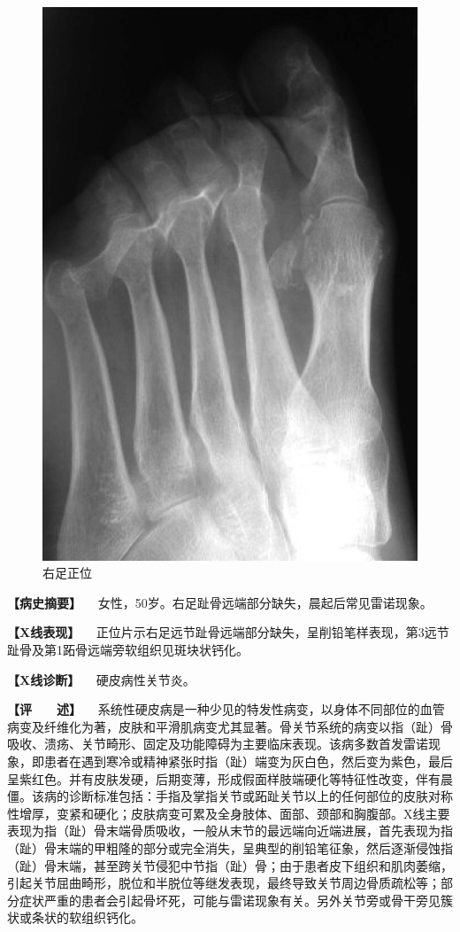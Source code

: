 \begin{figure}[!htbp]
 \centering
 \includegraphics{./images/Image00120.jpg}
 \captionsetup{justification=centering}
 \caption{右足正位}
 \label{fig2-8-6}
  \end{figure} 

\textbf{【病史摘要】}
　女性，50岁。右足趾骨远端部分缺失，晨起后常见雷诺现象。

\textbf{【X线表现】}
　正位片示右足远节趾骨远端部分缺失，呈削铅笔样表现，第3远节趾骨及第1跖骨远端旁软组织见斑块状钙化。

\textbf{【X线诊断】} 　硬皮病性关节炎。

\textbf{【评　　述】}
　系统性硬皮病是一种少见的特发性病变，以身体不同部位的血管病变及纤维化为著，皮肤和平滑肌病变尤其显著。骨关节系统的病变以指（趾）骨吸收、溃疡、关节畸形、固定及功能障碍为主要临床表现。该病多数首发雷诺现象，即患者在遇到寒冷或精神紧张时指（趾）端变为灰白色，然后变为紫色，最后呈紫红色。并有皮肤发硬，后期变薄，形成假面样肢端硬化等特征性改变，伴有晨僵。该病的诊断标准包括：手指及掌指关节或跖趾关节以上的任何部位的皮肤对称性增厚，变紧和硬化；皮肤病变可累及全身肢体、面部、颈部和胸腹部。X线主要表现为指（趾）骨末端骨质吸收，一般从末节的最远端向近端进展，首先表现为指（趾）骨末端的甲粗隆的部分或完全消失，呈典型的削铅笔征象，然后逐渐侵蚀指（趾）骨末端，甚至跨关节侵犯中节指（趾）骨；由于患者皮下组织和肌肉萎缩，引起关节屈曲畸形，脱位和半脱位等继发表现，最终导致关节周边骨质疏松等；部分症状严重的患者会引起骨坏死，可能与雷诺现象有关。另外关节旁或骨干旁见簇状或条状的软组织钙化。

